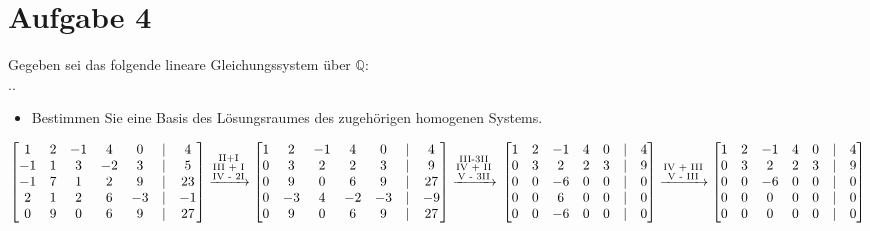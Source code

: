 \section*{Aufgabe 4}

Gegeben sei das folgende lineare Gleichungssystem über $\mathbb{Q}$:\\

\sysdelim..

\begin{itemize}[leftmargin=*, label={a)}]
\item Bestimmen Sie eine Basis des Lösungsraumes des zugehörigen homogenen Systems.
\end{itemize}

$
\begin{bmatrix}
1 & 2 & -1 & 4 & 0 & | & 4\\
-1 & 1 & 3 & -2 & 3 & | & 5\\
-1 & 7 & 1 & 2 & 9 & | & 23\\
2 & 1 & 2 & 6 & -3 & | & -1\\
0 & 9 & 0 & 6 & 9 & | & 27
\end{bmatrix}
\xrightarrow{\substack{\text{II+I} \\ \text{III + I} \\ \text{IV - 2I}}}
\begin{bmatrix}
1 & 2 & -1 & 4 & 0 & | & 4\\
0 & 3 & 2 & 2 & 3 & | & 9\\
0 & 9 & 0 & 6 & 9 & | & 27\\
0 & -3 & 4 & -2 & -3 & | & -9\\
0 & 9 & 0 & 6 & 9 & | & 27
\end{bmatrix}
\xrightarrow{\substack{\text{III-3II} \\ \text{IV + II} \\ \text{V - 3II}}}\\~\\~\\
\begin{bmatrix}
1 & 2 & -1 & 4 & 0 & | & 4\\
0 & 3 & 2 & 2 & 3 & | & 9\\
0 & 0 & -6 & 0 & 0 & | & 0\\
0 & 0 & 6 & 0 & 0 & | & 0\\
0 & 0 & -6 & 0 & 0 & | & 0
\end{bmatrix}
\xrightarrow{\substack{\text{IV + III} \\ \text{V - III}}}
\begin{bmatrix}
1 & 2 & -1 & 4 & 0 & | & 4\\
0 & 3 & 2 & 2 & 3 & | & 9\\
0 & 0 & -6 & 0 & 0 & | & 0\\
0 & 0 & 0 & 0 & 0 & | & 0\\
0 & 0 & 0 & 0 & 0 & | & 0
\end{bmatrix}
$\\~\\

\newpage